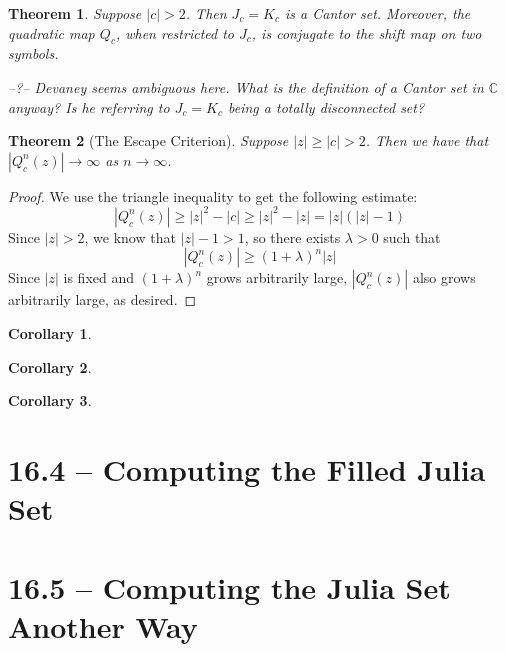 \documentclass[symmetric]{tufte-handout}
\newtheorem{theorem}{Theorem}
\newtheorem{corollary}{Corollary}
\begin{document}
\begin{theorem}
Suppose $|c| > 2$. Then $J_c=K_c$ is a Cantor set. Moreover, the quadratic map $Q_c$, when restricted to $J_c$, is conjugate to the shift map on two symbols.

--?-- Devaney seems ambiguous here. What is the definition of a Cantor set in $\mathbb{C}$ anyway? Is he referring to $J_c=K_c$ being a totally disconnected set?

\end{theorem}


\begin{theorem}[The Escape Criterion]
Suppose $|z|\geq|c|>2$. Then we have that $|Q_c^n(z)| \rightarrow \infty$ as $n \rightarrow \infty$.

\end{theorem}
\begin{proof}
We use the triangle inequality to get the following estimate:
\begin{equation}
    |Q_c^n(z)| \geq |z|^2 - |c| \geq |z|^2 - |z| = |z|(|z|-1)
\end{equation}
Since $|z| > 2$, we know that $|z|-1>1$, so there exists $\lambda > 0$ such that 
\begin{equation}
    |Q_c^n(z)| \geq (1+\lambda)^n|z|
\end{equation}
Since $|z|$ is fixed and $(1+\lambda)^n$ grows arbitrarily large, $|Q_c^n(z)|$ also grows arbitrarily large, as desired.

\end{proof}

\begin{corollary}

\end{corollary}

\begin{corollary}

\end{corollary}

\begin{corollary}

\end{corollary}






\section{16.4 -- Computing the Filled Julia Set}\label{sec:problem-1}










\section{16.5 -- Computing the Julia Set Another Way}\label{sec:problem-1}
\end{document}
